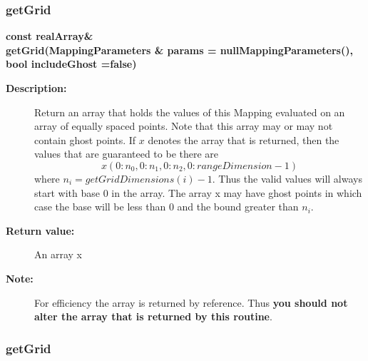 \subsubsection{getGrid}
 
\begin{flushleft} \textbf{%
const realArray\&  \\ 
\settowidth{\MappingIncludeArgIndent}{getGrid(}%
getGrid(MappingParameters \& params  = nullMappingParameters(),\\ 
\hspace{\MappingIncludeArgIndent}bool includeGhost  =false)
}\end{flushleft}
\begin{description}
\item[{\bf Description:}] 
   Return an array that holds the values of this Mapping evaluated on
  an array of equally spaced points. Note that this array may or may not
  contain ghost points. If $x$ denotes the array that is returned, then
  the values that are guaranteed to be there are
    \[
         x(0:n_0,0:n_1,0:n_2,0:rangeDimension-1) 
    \]
   where $n_i = getGridDimensions(i)-1$. Thus the valid values will always start
   with base 0 in the array. The array x may have ghost points in which case the
   base will be less than $0$ and the bound greater than $n_i$.
\item[{\bf Return value:}]  An array x 
\item[{\bf Note:}]  For efficiency the array is returned by reference. Thus {\bf you should not
    alter the array that is returned by this routine}.
\end{description}
\subsubsection{getGrid}
 
